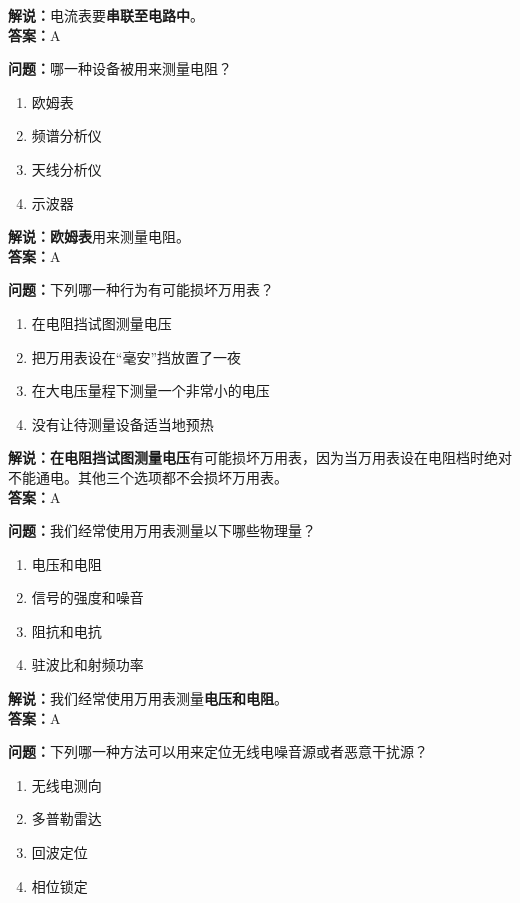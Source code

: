 \textbf{解说：}电流表要\textbf{串联至电路中}。\\\textbf{答案：}A%


\textbf{问题：}哪一种设备被用来测量电阻？

\begin{enumerate}[label=\Alph*), leftmargin=1cm]
	\item 欧姆表
	\item 频谱分析仪
	\item 天线分析仪
	\item 示波器
\end{enumerate}

\textbf{解说：欧姆表}用来测量电阻。\\\textbf{答案：}A


\textbf{问题：}下列哪一种行为有可能损坏万用表？

\begin{enumerate}[label=\Alph*), leftmargin=1cm]
	\item 在电阻挡试图测量电压
	\item 把万用表设在“毫安”挡放置了一夜
	\item 在大电压量程下测量一个非常小的电压
	\item 没有让待测量设备适当地预热
\end{enumerate}

\textbf{解说：在电阻挡试图测量电压}有可能损坏万用表，因为当万用表设在电阻档时绝对不能通电。其他三个选项都不会损坏万用表。\\\textbf{答案：}A%

\textbf{问题：}我们经常使用万用表测量以下哪些物理量？

\begin{enumerate}[label=\Alph*), leftmargin=1cm]
	\item 电压和电阻
	\item 信号的强度和噪音
	\item 阻抗和电抗
	\item 驻波比和射频功率
\end{enumerate}

\textbf{解说：}我们经常使用万用表测量\textbf{电压和电阻}。\\\textbf{答案：}A%


\textbf{问题：}下列哪一种方法可以用来定位无线电噪音源或者恶意干扰源？

\begin{enumerate}[label=\Alph*), leftmargin=1cm]
	\item 无线电测向
	\item 多普勒雷达
	\item 回波定位
	\item 相位锁定
\end{enumerate}

